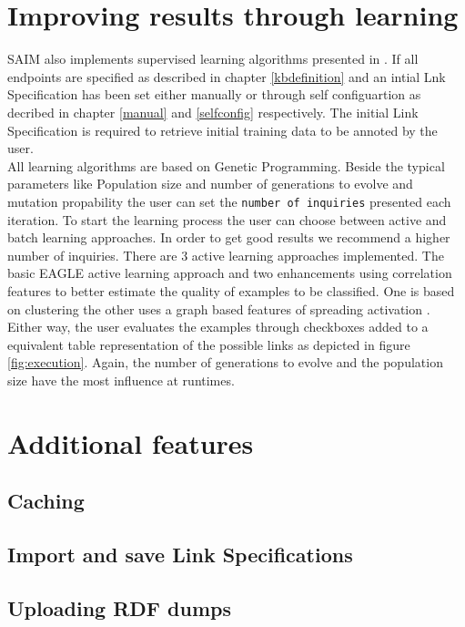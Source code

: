 \documentclass[oneside,a4paper,12pt]{memoir}
\begin{document}
\chapter{Improving results through learning}
\label{learning}
SAIM also implements supervised learning algorithms presented in \cite{NGLY12}. If all endpoints are specified as described in chapter \ref{kbdefinition} and an intial Lnk Specification has been set either manually or through self configuartion as decribed in chapter \ref{manual} and \ref{selfconfig} respectively. The initial Link Specification is required to retrieve initial training data to be annoted by the user.\\
All learning algorithms are based on Genetic Programming. Beside the typical parameters like Population size and number of generations to evolve and mutation propability the user can set the \texttt{number of inquiries} presented each iteration. To start the learning process the user can choose between active and batch learning approaches. In order to get good results we recommend a higher number of inquiries. There are 3 active learning approaches implemented. The basic EAGLE active learning approach \cite{NGLY12} and two enhancements using correlation features to better estimate the quality of examples to be classified. One is based on clustering the other uses a graph based features of spreading activation \cite{NGO+13}.\\
Either way, the user evaluates the examples through checkboxes added to a equivalent table representation of the possible links as depicted in figure \ref{fig:execution}. Again, the number of generations to evolve and the population size have the most influence at runtimes.
\chapter{Additional features}
\label{features}

\section{Caching}
\label{caching}


\section{Import and save Link Specifications}
\label{ImportExport}

\section{Uploading RDF dumps}
\label{upload}
\end{document}
